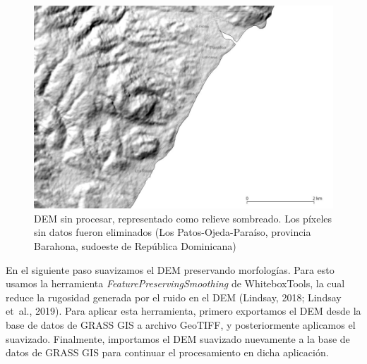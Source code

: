 \documentclass[spanish]{article}
\begin{document}
\begin{figure}

{\centering \includegraphics[width=1\linewidth]{figuras/dem-relleno} 

}

\caption{DEM sin procesar, representado como relieve sombreado. Los píxeles sin datos fueron eliminados (Los Patos-Ojeda-Paraíso, provincia Barahona, sudoeste de República Dominicana)}\label{fig:demrelleno}
\end{figure}

En el siguiente paso suavizamos el DEM preservando morfologías. Para
esto usamos la herramienta \emph{FeaturePreservingSmoothing} de
WhiteboxTools, la cual reduce la rugosidad generada por el ruido en el
DEM (Lindsay, 2018; Lindsay et~al., 2019). Para aplicar esta
herramienta, primero exportamos el DEM desde la base de datos de GRASS
GIS a archivo GeoTIFF, y posteriormente aplicamos el suavizado.
Finalmente, importamos el DEM suavizado nuevamente a la base de datos de
GRASS GIS para continuar el procesamiento en dicha aplicación.
\end{document}
